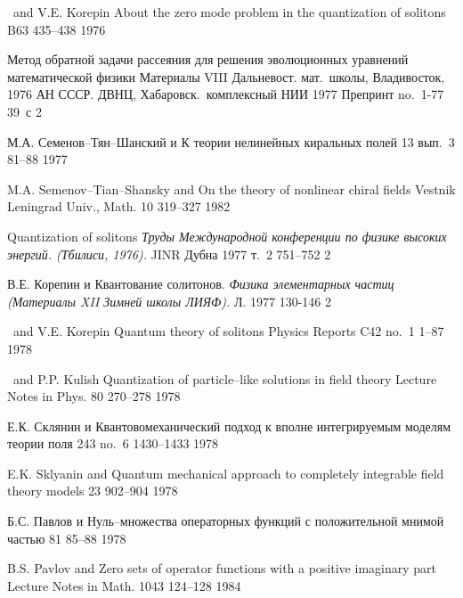 {\LF\ and V.E. Korepin}
{About the zero mode problem in the quantization of solitons}
{\PL} {B63} {} {435--438} {1976}

{\LD} 
{Метод обратной задачи рассеяния для решения эволюционных
 уравнений математической физики}
{Материалы VIII Дальневост. мат.\ школы, Владивосток, 1976}
{АН СССР. ДВНЦ, Хабаровск.\ комплексный НИИ} {} {1977}
{Препринт no.~1-77}
{39~с} {2}


{М.А. Семенов--Тян--Шанский и \LD}
{К теории нелинейных киральных полей}
{\Vestnik} {13} {вып.~3} {81--88} {1977}

{M.A. Semenov--Tian--Shansky and \LF}
{On the theory of nonlinear chiral fields}
{Vestnik Leningrad Univ., Math.}  {10} {319--327} {1982}

{\LF} 
{Quantization of solitons} 
{\em Труды Международной конференции по физике высоких энергий. (Тбилиси, 1976).} {JINR} {Дубна} {1977} {т.~2} {751--752} {2}

{В.Е. Корепин и \LD}
{Квантование солитонов.}
{\em Физика элементарных частиц (Материалы XII Зимней школы ЛИЯФ).}
{} {Л.} {1977} {} {130-146} {2}

{\LF\ and V.E. Korepin}
{Quantum theory of solitons}
{Physics Reports} {C42} {no.~1} {1--87} {1978}

{\LF\ and P.P. Kulish}
{Quantization of particle--like solutions in field theory}
{Lecture Notes in Phys.} {80} {} {270--278} {1978}

{Е.К. Склянин и \LD}
{Квантовомеханический подход к вполне интегрируемым моделям теории поля}
{\DAN} {243} {no.~6} {1430--1433} {1978}

{E.K. Sklyanin and \LF}
{Quantum mechanical approach to completely integrable field theory models}
{\SPD} {23} {902--904} {1978}

{Б.С. Павлов и \LD}
{Нуль--множества операторных функций с положительной мнимой частью}
{\Zap} {81} {}  {85--88} {1978}

{B.S. Pavlov and \LF}
{Zero sets of operator functions with a positive imaginary part}
{Lecture Notes in Math.} {1043} {124--128} {1984}

